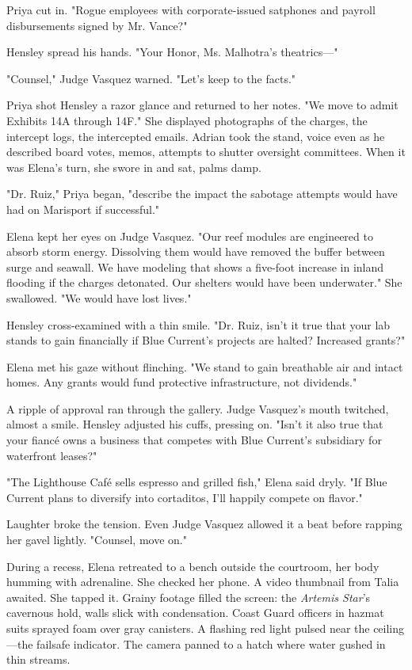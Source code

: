Priya cut in. "Rogue employees with corporate-issued satphones and payroll disbursements signed by Mr. Vance?"

Hensley spread his hands. "Your Honor, Ms. Malhotra's theatrics—"

"Counsel," Judge Vasquez warned. "Let's keep to the facts."

Priya shot Hensley a razor glance and returned to her notes. "We move to admit Exhibits 14A through 14F." She displayed photographs of the charges, the intercept logs, the intercepted emails. Adrian took the stand, voice even as he described board votes, memos, attempts to shutter oversight committees. When it was Elena's turn, she swore in and sat, palms damp.

"Dr. Ruiz," Priya began, "describe the impact the sabotage attempts would have had on Marisport if successful."

Elena kept her eyes on Judge Vasquez. "Our reef modules are engineered to absorb storm energy. Dissolving them would have removed the buffer between surge and seawall. We have modeling that shows a five-foot increase in inland flooding if the charges detonated. Our shelters would have been underwater." She swallowed. "We would have lost lives."

Hensley cross-examined with a thin smile. "Dr. Ruiz, isn't it true that your lab stands to gain financially if Blue Current's projects are halted? Increased grants?"

Elena met his gaze without flinching. "We stand to gain breathable air and intact homes. Any grants would fund protective infrastructure, not dividends."

A ripple of approval ran through the gallery. Judge Vasquez's mouth twitched, almost a smile. Hensley adjusted his cuffs, pressing on. "Isn't it also true that your fiancé owns a business that competes with Blue Current's subsidiary for waterfront leases?"

"The Lighthouse Café sells espresso and grilled fish," Elena said dryly. "If Blue Current plans to diversify into cortaditos, I'll happily compete on flavor."

Laughter broke the tension. Even Judge Vasquez allowed it a beat before rapping her gavel lightly. "Counsel, move on."

During a recess, Elena retreated to a bench outside the courtroom, her body humming with adrenaline. She checked her phone. A video thumbnail from Talia awaited. She tapped it. Grainy footage filled the screen: the \textit{Artemis Star}'s cavernous hold, walls slick with condensation. Coast Guard officers in hazmat suits sprayed foam over gray canisters. A flashing red light pulsed near the ceiling—the failsafe indicator. The camera panned to a hatch where water gushed in thin streams.

